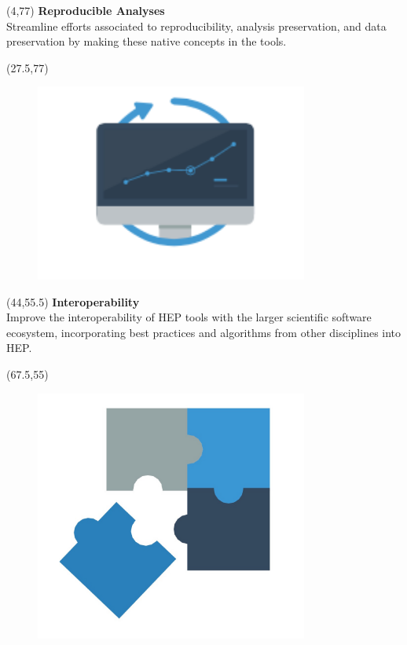 \documentclass[final]{beamer}
\begin{document}
\begin{frame}{}

\begin{textblock}{22.5}(4,77)
\textcolor{mybluelabel}{\bf Reproducible Analyses} \\
Streamline efforts associated to reproducibility, analysis preservation, and data preservation by making these native concepts in the tools.
\end{textblock}

\begin{textblock}{12.5}(27.5,77)
\begin{figure}[tbph]
\centering
\includegraphics[width=0.8\textwidth]{images/reproducible-ss.png}
\end{figure}
\end{textblock}


\begin{textblock}{22.5}(44,55.5)
\textcolor{mybluelabel}{\bf Interoperability} \\
Improve the interoperability of HEP tools with the larger scientific software ecosystem, incorporating best practices and algorithms from other disciplines into HEP.
\end{textblock}

\begin{textblock}{12.5}(67.5,55)
\begin{figure}[tbph]
\centering
\includegraphics[width=0.8\textwidth]{images/interoperable.jpg}
\end{figure}
\end{textblock}


\end{frame}
\end{document}
